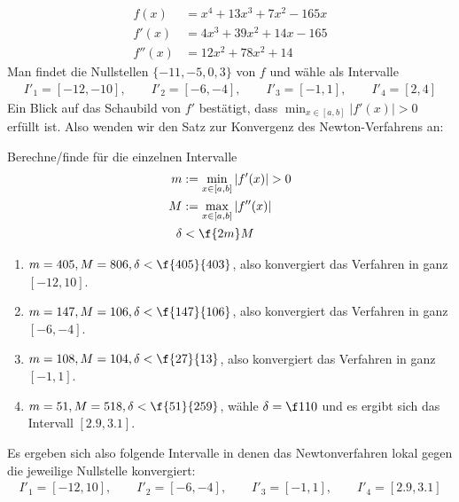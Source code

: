 \documentclass[a4paper]{scrartcl}
\begin{document}
\begin{aufgabe}~
	\begin{align*}
		f(x) &= x^4 + 13x^3 + 7x^2 - 165x \\
		f'(x) &= 4x^3 + 39x^2 + 14x - 165 \\
		f''(x) &= 12x^2 + 78x^2 + 14
	\end{align*}
	Man findet die Nullstellen $\{-11,-5,0,3\}$ von $f$ und wähle als Intervalle
	\begin{align*}
		I'_1 = [-12,-10], \qquad
		I'_2 = [-6,-4], \qquad
		I'_3 = [-1,1], \qquad
		I'_4 = [2,4]
	\end{align*}
	Ein Blick auf das Schaubild von $f'$ bestätigt, dass $\min_{x\in [a,b]} |f'(x)| > 0$ erfüllt ist.
	Also wenden wir den Satz zur Konvergenz des Newton-Verfahrens an:

	Berechne/finde für die einzelnen Intervalle
	\begin{align*}
		m &:= \min_{x\in [a,b]}|f'(x)| > 0 \\
		M &:= \max_{x\in [a,b]}|f''(x)| \\
		\delta &< \f {2m}M
	\end{align*}
	\begin{enumerate}[${I'}_1$:]
		\item $m=405, M=806, \delta < \f{405}{403}$, also konvergiert das Verfahren in ganz $[-12,10]$.
		\item $m=147, M=106, \delta < \f{147}{106}$, also konvergiert das Verfahren in ganz $[-6,-4]$.
		\item $m=108, M=104, \delta < \f{27}{13}$, also konvergiert das Verfahren in ganz $[-1,1]$.
		\item $m=51, M=518, \delta < \f{51}{259}$, wähle $\delta = \f 1{10}$ und es ergibt sich das Intervall $[2.9, 3.1]$.
	\end{enumerate}
	Es ergeben sich also folgende Intervalle in denen das Newtonverfahren lokal gegen die jeweilige Nullstelle konvergiert:
	\begin{align*}
		I'_1 = [-12,10], \qquad
		I'_2 = [-6,-4], \qquad
		I'_3 = [-1,1], \qquad
		I'_4 = [2.9, 3.1]
	\end{align*}
\end{aufgabe}
\end{document}
